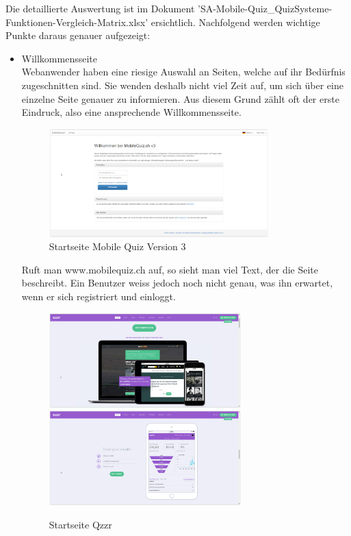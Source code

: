 	Die detaillierte Auswertung ist im Dokument 'SA-Mobile-Quiz\_QuizSysteme-Funktionen-Vergleich-Matrix.xlsx' ersichtlich. Nachfolgend werden wichtige Punkte daraus genauer aufgezeigt:
	
	\begin{itemize}
		\item Willkommensseite \\
		Webanwender haben eine riesige Auswahl an Seiten, welche auf ihr Bedürfnis zugeschnitten sind. Sie wenden deshalb nicht viel Zeit auf, um sich über eine einzelne Seite genauer zu informieren. Aus diesem Grund zählt oft der erste Eindruck, also eine ansprechende Willkommensseite. \\
		
		\begin{figure}[h]
			\centering
			\includegraphics[width=0.8\textwidth]{Images/MobileQuiz_StartPage.PNG}
			\caption{Startseite Mobile Quiz Version 3}
		\end{figure}
		
		Ruft man www.mobilequiz.ch auf, so sieht man viel Text, der die Seite beschreibt. Ein Benutzer weiss jedoch noch nicht genau, was ihn erwartet, wenn er sich registriert und einloggt.
		
		\begin{figure}[h]
			\centering
			\includegraphics[width=0.7\textwidth]{Images/Qzzr_StartPage.PNG}
			\includegraphics[width=0.7\textwidth]
			{Images/Qzzr_StartPage_Statistics.PNG}
			\caption{Startseite Qzzr}
		\end{figure}
				

\end{itemize}
